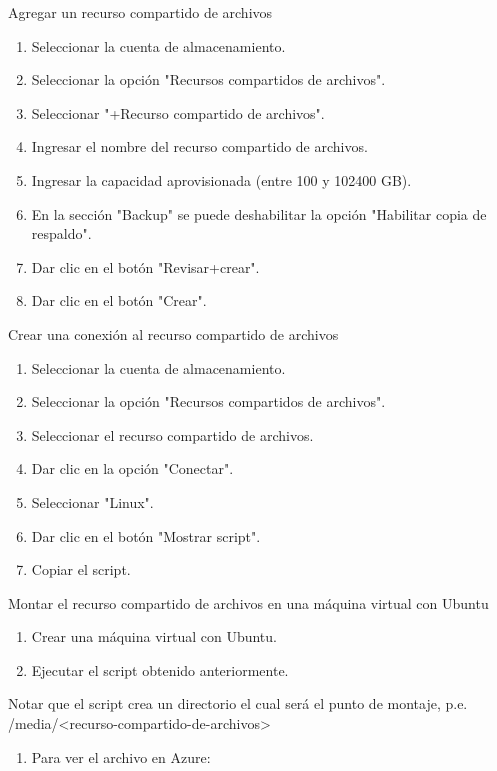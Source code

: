 Agregar un recurso compartido de archivos

\begin{enumerate}
\item Seleccionar la cuenta de almacenamiento.
\item Seleccionar la opción "Recursos compartidos de archivos".
\item Seleccionar "+Recurso compartido de archivos".
\item Ingresar el nombre del recurso compartido de archivos.
\item Ingresar la capacidad aprovisionada (entre 100 y 102400 GB).
\item En la sección "Backup" se puede deshabilitar la opción "Habilitar copia de respaldo".
\item Dar clic en el botón "Revisar+crear".
\item Dar clic en el botón "Crear".
\end{enumerate}

Crear una conexión al recurso compartido de archivos

\begin{enumerate}
\item Seleccionar la cuenta de almacenamiento.
\item Seleccionar la opción "Recursos compartidos de archivos".
\item Seleccionar el recurso compartido de archivos.
\item Dar clic en la opción "Conectar".
\item Seleccionar "Linux".
\item Dar clic en el botón "Mostrar script".
\item Copiar el script.
\end{enumerate}

Montar el recurso compartido de archivos en una máquina virtual con Ubuntu

\begin{enumerate}
\item Crear una máquina virtual con Ubuntu.
\item Ejecutar el script obtenido anteriormente.
\end{enumerate}

Notar que el script crea un directorio el cual será el punto de montaje, p.e. /media/<recurso-compartido-de-archivos>

\begin{enumerate}
\item Para ver el archivo en Azure:
\end{enumerate}

